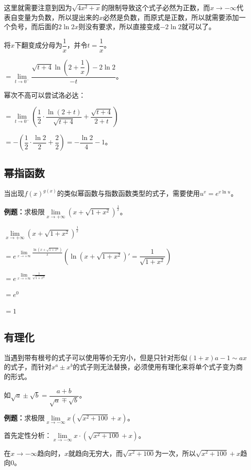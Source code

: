 这里就需要注意到因为$\sqrt{4x^2+x}$的限制导致这个式子必然为正数，而$x\to-\infty$代表自变量为负数，所以提出来的$x$必然是负数，而原式是正数，所以就需要添加一个负号，而后面的$2\ln 2x$则没有要求，所以直接变成$-2\ln 2$就可以了。

将$x$下翻变成分母为$\dfrac{1}{x}$，并令$t=\dfrac{1}{x}$。\medskip

$=\lim\limits_{t\to 0^-}\dfrac{\sqrt{t+4}\ln\left(2+\dfrac{1}{x}\right)-2\ln 2}{-t}$。\medskip

幂次不高可以尝试洛必达：\medskip

$=\lim\limits_{t\to 0^-}\left(\dfrac{1}{2}\cdot\dfrac{\ln(2+t)}{\sqrt{t+4}}+\dfrac{\sqrt{t+4}}{2+t}\right)$\medskip

$=-\left(\dfrac{1}{2}\cdot\dfrac{\ln 2}{2}+\dfrac{2}{2}\right)=-\dfrac{\ln 2}{4}-1$。

\subsection{幂指函数}

当出现$f(x)^{g(x)}$的类似幂函数与指数函数类型的式子，需要使用$u^v=e^{v\ln u}$。

\textbf{例题：}求极限$\lim\limits_{x\to+\infty}(x+\sqrt{1+x^2})^{\frac{1}{x}}$。\medskip

$\lim\limits_{x\to+\infty}(x+\sqrt{1+x^2})^{\frac{1}{x}}$ \medskip

$=e^{\lim\limits_{x\to+\infty}\frac{\ln(x+\sqrt{1+x^2})}{x}} \left(\ln(x+\sqrt{1+x^2})'=\dfrac{1}{\sqrt{1+x^2}}\right)$\medskip

$=e^{\lim\limits_{x\to+\infty}\frac{1}{\sqrt{1+x^2}}}$

$=e^0$

$=1$

\subsection{有理化}

当遇到带有根号的式子可以使用等价无穷小，但是只针对形似$(1+x)a-1\sim ax$的式子，而针对$x^a\pm x^b$的式子则无法替换，必须使用有理化来将单个式子变为商的形式。

如$\sqrt{a}\pm\sqrt{b}=\dfrac{a+b}{\sqrt{a}\mp\sqrt{b}}$。\medskip

\textbf{例题：}求极限$\lim\limits_{x\to-\infty}x(\sqrt{x^2+100}+x)$。

首先定性分析：$\lim\limits_{x\to-\infty}x\cdot(\sqrt{x^2+100}+x)$。

在$x\to-\infty$趋向时，$x$就趋向无穷大，而$\sqrt{x^2+100}$为一次，所以$\sqrt{x^2+100}+x$趋向0。

